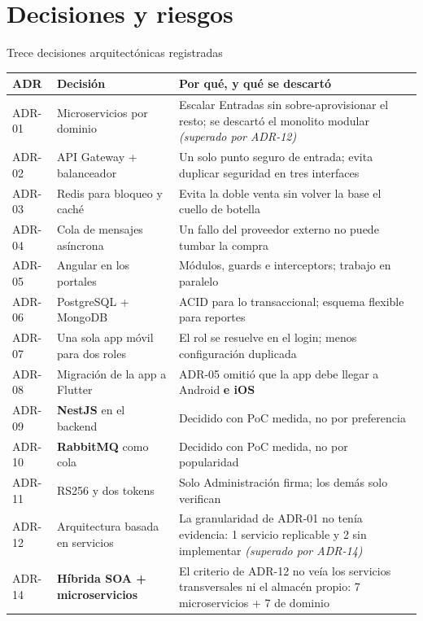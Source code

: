 \documentclass[aspectratio=169,10pt,xcolor={table}]{beamer}
\begin{document}
\section{Decisiones y riesgos}

\begin{frame}{Trece decisiones arquitectónicas registradas}
  \scriptsize
  \begin{tabular}{C{1.1cm}L{4.6cm}L{6.6cm}}
    \toprule
    \textbf{ADR} & \textbf{Decisión} & \textbf{Por qué, y qué se descartó} \\
    \midrule
    ADR-01 & Microservicios por dominio & Escalar Entradas sin sobre-aprovisionar el resto;
      se descartó el monolito modular \textit{(superado por ADR-12)} \\
    ADR-02 & API Gateway + balanceador & Un solo punto seguro de entrada; evita duplicar
      seguridad en tres interfaces \\
    ADR-03 & Redis para bloqueo y caché & Evita la doble venta sin volver la base el cuello de
      botella \\
    ADR-04 & Cola de mensajes asíncrona & Un fallo del proveedor externo no puede tumbar la
      compra \\
    ADR-05 & Angular en los portales & Módulos, guards e interceptors; trabajo en paralelo \\
    ADR-06 & PostgreSQL + MongoDB & ACID para lo transaccional; esquema flexible para reportes \\
    ADR-07 & Una sola app móvil para dos roles & El rol se resuelve en el login; menos
      configuración duplicada \\
    ADR-08 & Migración de la app a Flutter & ADR-05 omitió que la app debe llegar a Android
      \textbf{e iOS} \\
    ADR-09 & \textbf{NestJS} en el backend & Decidido con PoC medida, no por preferencia \\
    ADR-10 & \textbf{RabbitMQ} como cola & Decidido con PoC medida, no por popularidad \\
    ADR-11 & RS256 y dos tokens & Solo Administración firma; los demás solo verifican \\
    ADR-12 & Arquitectura basada en servicios & La granularidad de ADR-01 no tenía evidencia:
      1 servicio replicable y 2 sin implementar \textit{(superado por ADR-14)} \\
    ADR-14 & \textbf{Híbrida SOA + microservicios} & El criterio de ADR-12 no veía los servicios
      transversales ni el almacén propio: 7 microservicios + 7 de dominio \\
    \bottomrule
  \end{tabular}
\end{frame}
\end{document}
